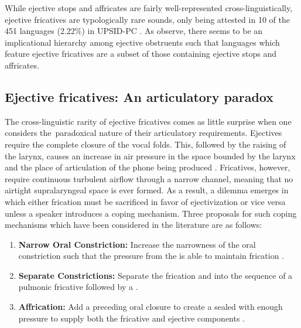 \documentclass[output=paper,newtxmath,modfonts,nonflat,final]{langsci/langscibook}
\begin{document}

While ejective stops and affricates are fairly well-represented cross-linguistically, ejective fricatives are typologically rare sounds, only being attested in 10 of the 451 languages (2.22\%) in UPSID-PC \citep{maddieson1990updating}. As \citet{shosted2011affricating} observe, there seems to be an implicational hierarchy among ejective obstruents such that languages which feature ejective fricatives are a subset of those containing ejective stops and affricates.

\subsection{Ejective fricatives: An articulatory paradox}\label{sec:moeng:2.2}

The cross-linguistic rarity of ejective fricatives comes as little surprise when one considers the~paradoxical nature of their articulatory requirements. Ejectives require the complete closure of the vocal folds. This, followed by the raising of the larynx, causes an increase in air pressure in the space bounded by the larynx and the place of articulation of the phone being produced \citep[130]{Ladefoged1993}. Fricatives, however, require continuous turbulent airflow through a narrow channel, meaning that no airtight supralaryngeal space is ever formed. As a result, a dilemma emerges in which either frication must be sacrificed in favor of ejectivization or vice versa unless a speaker introduces a coping mechanism. Three proposals for such coping mechanisms which have been considered in the literature are as follows:

\begin{enumerate}
	\item \textbf{Narrow Oral Constriction:} Increase the narrowness of the oral constriction such that the pressure from the  is able to maintain frication \citep{maddieson1997,maddieson1998make}.
\item \textbf{Separate Constrictions:} Separate the frication and  into the sequence of a pulmonic fricative followed by a  \citep{maddieson1997,maddieson1998make}.
\item \textbf{Affrication:} Add a preceding oral closure to create a sealed  with enough pressure to supply both the fricative and ejective components \citep{shosted2011affricating}.
\end{enumerate}
\end{document}
